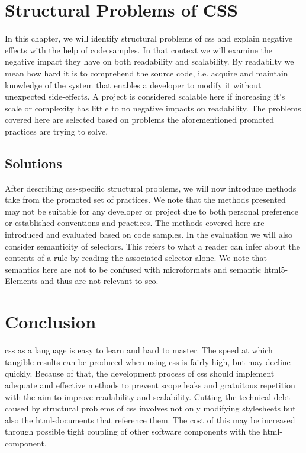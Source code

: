 

\chapter{Structural Problems of CSS}
In this chapter, we will identify structural problems of \gls{css} and explain negative effects with the help of code samples.
In that context we will examine the negative impact they have on both readability and scalability.
By readabilty we mean how hard it is to comprehend the source code, i.e. acquire and maintain knowledge of the system that enables a developer to modify it without unexpected side-effects.
A project is considered scalable here if increasing it's scale or complexity has little to no negative impacts on readability.
The problems covered here are selected based on problems the aforementioned promoted practices are trying to solve.





\section{Solutions}
After describing \gls{css}-specific structural problems, we will now introduce methods take from the promoted set of practices.
We note that the methods presented may not be suitable for any developer or project due to both personal preference or established conventions and practices.
The methods covered here are introduced and evaluated based on code samples.
In the evaluation we will also consider semanticity of selectors.
This refers to what a reader can infer about the contents of a rule by reading the associated selector alone.
We note that semantics here are not to be confused with microformats and semantic \gls{html}5-Elements and thus are not relevant to \gls{seo}.




\chapter{Conclusion}
\gls{css} as a language is easy to learn and hard to master.
The speed at which tangible results can be produced when using \gls{css} is fairly high, but may decline quickly.
Because of that, the development process of \gls{css} should implement adequate and effective methods to prevent scope leaks and gratuitous repetition with the aim to improve readability and scalability.
Cutting the technical debt caused by structural problems of \gls{css} involves not only modifying stylesheets but also the \gls{html}-documents that reference them.
The cost of this may be increased through possible tight coupling of other software components with the \gls{html}-component.

